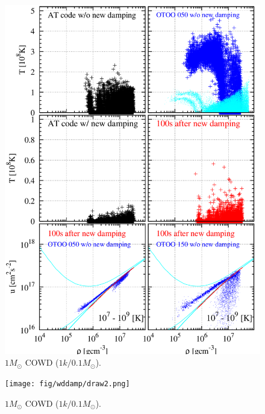 \documentclass[fleqn,dvipdfmx]{article}
\begin{document}
\begin{figure}
  \begin{center}
    \includegraphics[width=14cm,bb=0 0 880 1200]{fig/wddamp/draw.png}
  \end{center}
  \caption{$1M_\odot$ COWD ($1k/0.1M_{\odot}$).}
\end{figure}

\begin{figure}
  \begin{center}
    \texttt{[image: fig/wddamp/draw2.png]}
  \end{center}
  \caption{$1M_\odot$ COWD ($1k/0.1M_{\odot}$).}
\end{figure}
\end{document}
